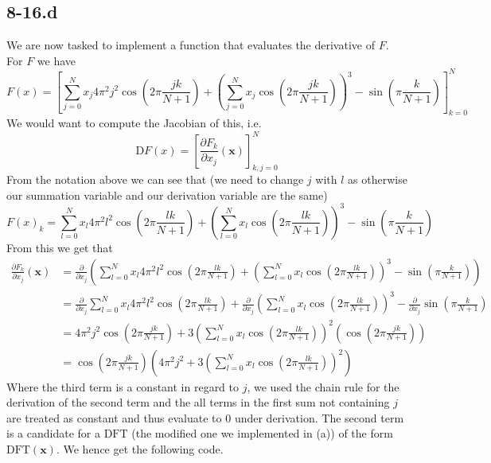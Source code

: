 \documentclass{article}
\begin{document}
\subsection*{8-16.d} 
We are now tasked to implement a function that evaluates the derivative of $F$. For $F$ we have
\begin{equation*}
F\left(x\right) = \left[\sum_{j=0}^{N}x_{j}4\pi^{2} j^{2}\cos\left(2\pi \frac{jk}{N+1}\right) + \left(\sum_{j=0}^{N}x_{j}\cos\left(2\pi \frac{jk}{N+1}\right)\right)^{3} -\sin\left(\pi \frac{k}{N+1}\right)\right]_{k=0}^{N}
\end{equation*}
We would want to compute the Jacobian of this, i.e.
\begin{equation*}
    \mathrm{D}F\left(x\right) = \left[\frac{\partial F_{k}}{\partial x_{j}}\left(\mathbf{x}\right)\right]_{k,j = 0}^{N}
\end{equation*}
From the notation above we can see that (we need to change $j$ with $l$ as otherwise our summation variable and our derivation variable are the same)
\begin{equation*}
F\left(x\right)_{k} = \sum_{l=0}^{N}x_{l}4\pi^{2} l^{2}\cos\left(2\pi \frac{lk}{N+1}\right) + \left(\sum_{l=0}^{N}x_{l}\cos\left(2\pi \frac{lk}{N+1}\right)\right)^{3} -\sin\left(\pi \frac{k}{N+1}\right)
\end{equation*}
From this we get that
\begin{align*}
    \frac{\partial F_{k}}{\partial x_{j}}\left(\mathbf{x}\right) &= \frac{\partial}{\partial x_{j}}\left(\sum_{l=0}^{N}x_{l}4\pi^{2} l^{2}\cos\left(2\pi \frac{lk}{N+1}\right) + \left(\sum_{l=0}^{N}x_{l}\cos\left(2\pi \frac{lk}{N+1}\right)\right)^{3} -\sin\left(\pi \frac{k}{N+1}\right)\right)  \\
    &= \frac{\partial}{\partial x_{j}}\sum_{l=0}^{N}x_{l}4\pi^{2} l^{2}\cos\left(2\pi \frac{lk}{N+1}\right) + \frac{\partial}{\partial x_{j}}\left(\sum_{l=0}^{N}x_{l}\cos\left(2\pi \frac{lk}{N+1}\right)\right)^{3} -\frac{\partial}{\partial x_{j}}\sin\left(\pi \frac{k}{N+1}\right) \\
    &= 4\pi^{2} j^{2}\cos\left(2\pi \frac{jk}{N+1}\right) + 3\left(\sum_{l=0}^{N}x_{l}\cos\left(2\pi \frac{lk}{N+1}\right)\right)^{2}\left(\cos\left(2\pi \frac{jk}{N+1}\right)\right) \\
    &= \cos\left(2\pi \frac{jk}{N+1}\right)\left(4\pi^{2} j^{2} + 3\left(\sum_{l=0}^{N}x_{l}\cos\left(2\pi \frac{lk}{N+1}\right)\right)^{2}\right)
\end{align*}
Where the third term is a constant in regard to $j$, we used the chain rule for the derivation of the second term and the all terms in the first sum not containing $j$ are treated as constant and thus evaluate to $0$ under derivation. The second term is a candidate for a $\mathrm{DFT}$ (the modified one we implemented in (a)) of the form $\mathrm{DFT}\left(\mathbf{x}\right)$. We hence get the following code. 
\end{document}
